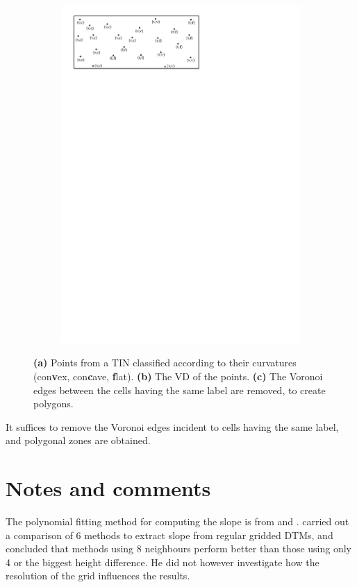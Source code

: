 \begin{figure}
\begin{subfigure}[b]{0.45\linewidth}
    \includegraphics[page=3,width=\textwidth]{figs/vd}
    \caption{}
  \end{subfigure}%
\caption{\textbf{(a)} Points from a TIN classified according to their curvatures (con\textbf{v}ex, con\textbf{c}ave, \textbf{f}lat). \textbf{(b)} The VD of the points. \textbf{(c)} The Voronoi edges between the cells having the same label are removed, to create polygons.}
\label{fig:vd}
\end{figure}
It suffices to remove the Voronoi edges incident to cells having the same label, and polygonal zones are obtained.




%
\section{Notes and comments}

The polynomial fitting method for computing the slope is from \citet{Evans80} and \citet{Wood96}.
\citet{Skidmore89} carried out a comparison of 6 methods to extract slope from regular gridded DTMs, and concluded that methods using 8 neighbours perform better than those using only 4 or the biggest height difference.
He did not however investigate how the resolution of the grid influences the results.

